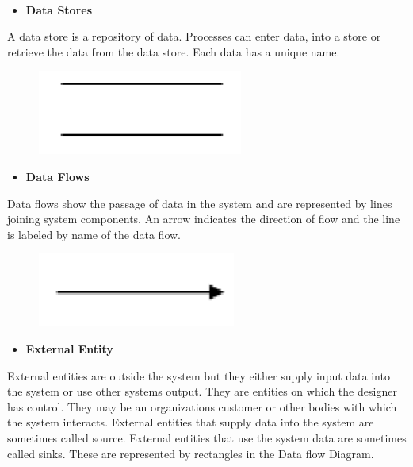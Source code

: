 \documentclass[12pt,a4paper,oneside]{report}
\begin{document}
  \\
  \begin{itemize}
  \item\textbf{Data Stores}
  \end{itemize}
\par A data store is a repository of data. Processes can enter data, into a store or retrieve the
data from the data store. Each data has a unique name.\\
\begin{figure}[h]
  	\begin{center}
  	
  	
  		\includegraphics[width=3 in,height=1 in]{process.png}
  			\end{center}
  \end{figure}
  
  \begin{itemize}
  \item\textbf{Data Flows}
  \end{itemize}
  \par Data flows show the passage of data in the system and are represented by lines joining
  system components. An arrow indicates the direction of flow and the line is labeled by
  name of the data flow.\\
  
  \begin{figure}[h]
    	\begin{center}
    	\includegraphics[width=3 in,height=1 in]{data.png}
    			\end{center}
    \end{figure}
 \newpage
 \begin{itemize}
 \item\textbf{External Entity}
 \end{itemize}
 \par External entities are outside the system but they either supply input data into the system or
 use other systems output. They are entities on which the designer has control. They may
 be an organizations customer or other bodies with which the system interacts. External
 entities that supply data into the system are sometimes called source. External entities that use the system data are sometimes called sinks. These are represented by rectangles
 in the Data flow Diagram.\\
 
\end{document}
